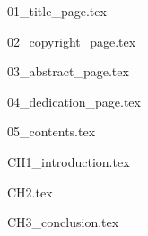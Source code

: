 \documentclass[12pt]{report}
\begin{document}

{01_title_page.tex}

\newpage
{02_copyright_page.tex}

\newpage
{03_abstract_page.tex}

\newpage 
{04_dedication_page.tex}

\newpage
{05_contents.tex}



\newpage
{}
{CH1_introduction.tex}

\newpage
{CH2.tex}

\newpage
{CH3_conclusion.tex}



\restoregeometry
\end{document}

